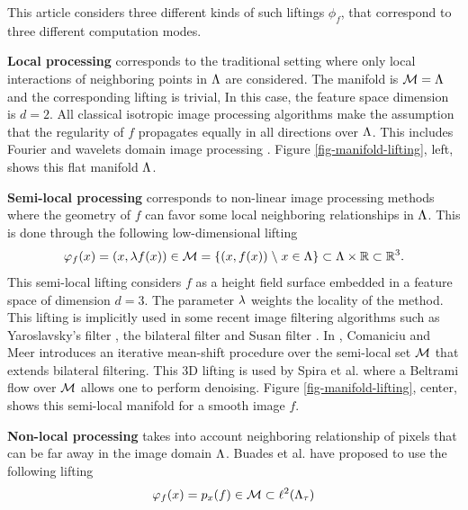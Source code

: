 \documentclass[final]{siamltex}
\newcommand{\manilift}{\phi_f}
\begin{document}
This article considers three different kinds of such liftings $\manilift$, that correspond to three different computation modes.
\begin{rs}
	\item \textbf{Local processing} corresponds to the traditional setting where only local interactions of neighboring points in $\Lambda$ are considered. The manifold is $\mathcal{M} = \Lambda$ and the corresponding lifting is trivial,
	\eql{	\label{eq-manifold-local}
		\foralls x \in \Mm=\La, \quad \manilift(x) = x.
	}
	In this case, the feature space dimension is $d=2$.
	All classical isotropic image processing algorithms make the assumption that the regularity of $f$ propagates equally in all directions over $\Lambda$. This includes Fourier and wavelets domain image processing \cite{mallat-book}.  Figure \ref{fig-manifold-lifting}, left, shows this flat manifold $\Lambda$.
	\item \textbf{Semi-local processing} corresponds to non-linear image processing methods where the geometry of $f$ can favor some local neighboring relationships in $\Lambda$. This is done through the following low-dimensional lifting
	\begin{equation}
		\label{eq-manifold-semi-local}
		\manilift(x) = (x,\la f(x)) \in \Mm =  \enscond{(x,f(x))}{x \in \La} \subset \La \times \RR \subset \RR^3.
	\end{equation}
	This semi-local lifting considers $f$ as a height field surface embedded in a feature space of dimension $d=3$.
	The parameter $\lambda$ weights the locality of the method.
	This lifting is implicitly used in some recent image filtering algorithms such as Yaroslavsky's filter \cite{yaroslavsky-book}, the bilateral filter \cite{tomasi-bilateral} and Susan filter \cite{smith-susan}. In \cite{comaniciu-mean-shift}, Comaniciu and Meer introduces an iterative mean-shift procedure over the semi-local set $\mathcal{M}$ that extends bilateral filtering. This 3D lifting is used by Spira et al. \cite{spira-short-time-beltrami} where a Beltrami flow over $\mathcal{M}$ allows one to perform denoising. 
	Figure \ref{fig-manifold-lifting}, center, shows this semi-local manifold for a smooth image $f$. 
	\item \textbf{Non-local processing} takes into account neighboring relationship of pixels that can be far away in the image domain $\Lambda$. Buades et al. \cite{buades-nl-means} have proposed to use the following lifting 
	\begin{equation}
		\label{eq-lifting-non-local}
		\manilift(x) = p_x(f) \in \Mm \subset \ldeux(\La_\tau)
	\end{equation}

\end{rs}
\end{document}
